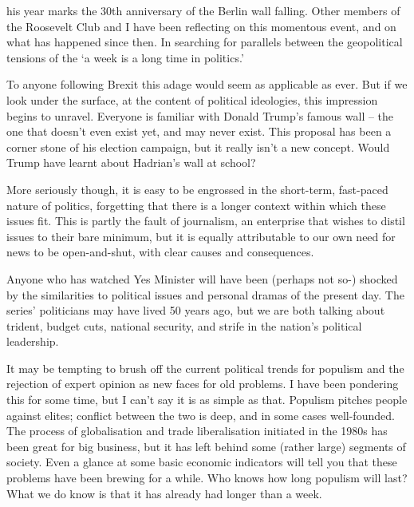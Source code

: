 \label{ch:one-week-in-politics}

his year marks the 30th anniversary of the Berlin wall falling. Other
   members of the Roosevelt Club and I have been reflecting on this
   momentous event, and on what has happened since then. In searching for
   parallels between the geopolitical tensions of the `a week is a long
   time in politics.'

   To anyone following Brexit this adage would seem as applicable as ever.
   But if we look under the surface, at the content of political
   ideologies, this impression begins to unravel. Everyone is familiar
   with Donald Trump's famous wall -- the one that doesn't even exist yet,
   and may never exist. This proposal has been a corner stone of his
   election campaign, but it really isn't a new concept. Would Trump have
   learnt about Hadrian's wall at school?

   More seriously though, it is easy to be engrossed in the short-term,
   fast-paced nature of politics, forgetting that there is a longer
   context within which these issues fit. This is partly the fault of
   journalism, an enterprise that wishes to distil issues to their bare
   minimum, but it is equally attributable to our own need for news to be
   open-and-shut, with clear causes and consequences.

   Anyone who has watched Yes Minister will have been (perhaps not so-)
   shocked by the similarities to political issues and personal dramas of
   the present day. The series' politicians may have lived 50 years ago,
   but we are both talking about trident, budget cuts, national security,
   and strife in the nation's political leadership.

   It may be tempting to brush off the current political trends for
   populism and the rejection of expert opinion as new faces for old
   problems. I have been pondering this for some time, but I can't say it
   is as simple as that. Populism pitches people against elites; conflict
   between the two is deep, and in some cases well-founded. The process of
   globalisation and trade liberalisation initiated in the 1980s has been
   great for big business, but it has left behind some (rather large)
   segments of society. Even a glance at some basic economic indicators
   will tell you that these problems have been brewing for a while. Who
   knows how long populism will last? What we do know is that it has
   already had longer than a week.


